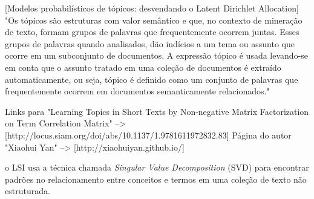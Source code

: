 [Modelos probabilísticos de tópicos: desvendando o Latent Dirichlet Allocation]
"Os tópicos são estruturas com valor semântico e que, no contexto de mineração de texto, formam grupos de palavras que frequentemente ocorrem juntas. Esses grupos de palavras quando analisados, dão indícios a um tema ou assunto que ocorre em um subconjunto de documentos. A expressão tópico é usada levando-se em conta que o assunto tratado em uma coleção de documentos é extraído automaticamente, ou seja, tópico é definido como um conjunto de palavras que frequentemente ocorrem em documentos semanticamente relacionados."











Links para "Learning Topics in Short Texts by Non-negative Matrix Factorization on Term Correlation Matrix" --> [http://locus.siam.org/doi/abs/10.1137/1.9781611972832.83]
Página do autor "Xiaohui Yan" --> [http://xiaohuiyan.github.io/]







o LSI usa a técnica chamada \textit{Singular Value Decomposition} (SVD) para encontrar padrões no relacionamento entre conceitos e termos em uma coleção de texto não estruturada.

